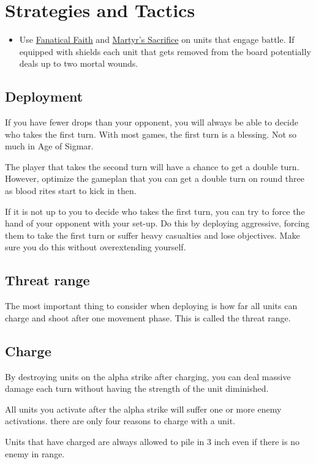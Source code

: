 \section{Strategies and Tactics}
\begin{itemize}
    \item Use \hyperref[fanatical-faith]{Fanatical Faith} and \hyperref[martyrs-sacrifice]{Martyr's Sacrifice} on units that engage battle. If equipped with shields each unit that gets removed from the board potentially deals up to two mortal wounds.
\end{itemize}

\subsection{Deployment}
If you have fewer drops than your opponent, you will always be able to decide
who takes the first turn. With most games, the first turn is a blessing. Not so
much in Age of Sigmar.

The player that takes the second turn will have a chance to get a double turn.
However, optimize the gameplan that you can get a double turn on round three as
blood rites start to kick in then.

If it is not up to you to decide who takes the first turn, you can try to force
the hand of your opponent with your set-up. Do this by deploying aggressive,
forcing them to take the first turn or suffer heavy casualties and lose
objectives. Make sure you do this without overextending yourself.

\subsection{Threat range} The most important thing to consider when deploying
is how far all units can charge and shoot after one movement phase. This is
called the threat range.

\subsection{Charge} By destroying units on the alpha strike after charging, you
can deal massive damage each turn without having the strength of the unit
diminished.

All units you activate after the alpha strike will suffer one or more enemy
activations.  there are only four reasons to charge with a unit.

Units that have charged are always allowed to pile in 3 inch even if there is
no enemy in range. 

